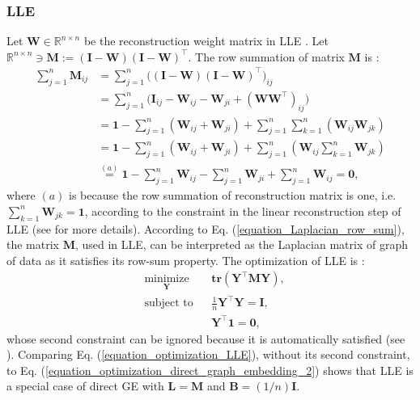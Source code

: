 \documentclass[lang=cn,10pt]{gorgeousnbook}
\numberwithin{equation}{section}%
\numberwithin{figure}{section}%
\begin{document}
\subsubsection{LLE}

Let $\boldsymbol{W} \in \mathbb{R}^{n \times n}$ be the reconstruction weight matrix in LLE \cite{roweis2000nonlinear,ghojogh2020locally}. Let $\mathbb{R}^{n \times n} \ni \boldsymbol{M} := (\boldsymbol{I} - \boldsymbol{W}) (\boldsymbol{I} - \boldsymbol{W})^\top$.
The row summation of matrix $\boldsymbol{M}$ is \cite{yan2005graph,yan2006graph}:
\begin{align*}
\sum_{j=1}^n \boldsymbol{M}_{ij} &= \sum_{j=1}^n \big((\boldsymbol{I} - \boldsymbol{W}) (\boldsymbol{I} - \boldsymbol{W})^\top\big)_{ij} \\
&= \sum_{j=1}^n \big(\boldsymbol{I}_{ij} - \boldsymbol{W}_{ij} - \boldsymbol{W}_{ji} + (\boldsymbol{W}\boldsymbol{W}^\top)_{ij}\big) \\
&= \boldsymbol{1} - \sum_{j=1}^n (\boldsymbol{W}_{ij} + \boldsymbol{W}_{ji}) + \sum_{j=1}^n \sum_{k=1}^n (\boldsymbol{W}_{ij} \boldsymbol{W}_{jk}) \\
&= \boldsymbol{1} - \sum_{j=1}^n (\boldsymbol{W}_{ij} + \boldsymbol{W}_{ji}) + \sum_{j=1}^n (\boldsymbol{W}_{ij} \sum_{k=1}^n \boldsymbol{W}_{jk}) \\
&\overset{(a)}{=} \boldsymbol{1} - \sum_{j=1}^n \boldsymbol{W}_{ij} - \sum_{j=1}^n \boldsymbol{W}_{ji} + \sum_{j=1}^n \boldsymbol{W}_{ij} = \boldsymbol{0},
\end{align*}
where $(a)$ is because the row summation of reconstruction matrix is one, i.e. $\sum_{k=1}^n \boldsymbol{W}_{jk} = \boldsymbol{1}$, according to the constraint in the linear reconstruction step of LLE (see \cite{ghojogh2020locally} for more details). 
According to Eq. (\ref{equation_Laplacian_row_sum}), the matrix $\boldsymbol{M}$, used in LLE, can be interpreted as the Laplacian matrix of graph of data as it satisfies its row-sum property. 
The optimization of LLE is \cite{ghojogh2020locally}:
\begin{equation}\label{equation_optimization_LLE}
\begin{aligned}
& \underset{\boldsymbol{Y}}{\text{minimize}}
& & \textbf{tr}(\boldsymbol{Y}^\top\boldsymbol{M}\boldsymbol{Y}), \\
& \text{subject to}
& & \frac{1}{n} \boldsymbol{Y}^\top \boldsymbol{Y} = \boldsymbol{I}, \\
& & & \boldsymbol{Y}^\top \boldsymbol{1} = \boldsymbol{0},
\end{aligned}
\end{equation}
whose second constraint can be ignored because it is automatically satisfied (see \cite{ghojogh2020locally}). 
Comparing Eq. (\ref{equation_optimization_LLE}), without its second constraint, to Eq. (\ref{equation_optimization_direct_graph_embedding_2}) shows that LLE is a special case of direct GE with $\boldsymbol{L} = \boldsymbol{M}$ and $\boldsymbol{B} = (1/n) \boldsymbol{I}$. 
\end{document}
